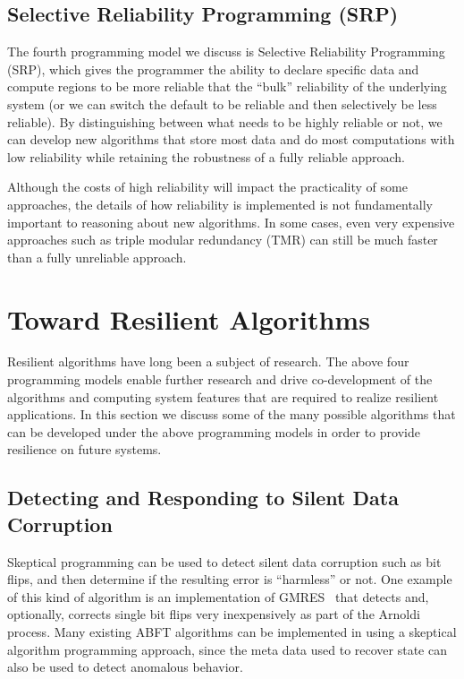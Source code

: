 \documentclass[10pt, twocolumn]{IEEEtran}
\begin{document}
\subsection{Selective Reliability Programming (SRP)}
The fourth programming model we discuss is Selective Reliability Programming (SRP), which gives the programmer the ability to declare specific data and compute regions to be more reliable that the ``bulk'' reliability of the underlying system (or we can switch the default to be reliable and then selectively be less reliable).  By distinguishing between what needs to be highly reliable or not, we can develop new algorithms that store most data and do most computations with low reliability while retaining the robustness of a fully reliable approach.

Although the costs of high reliability will impact the practicality of some approaches, the details of how reliability is  implemented is not fundamentally important to reasoning about new algorithms.  In some cases, even very expensive approaches such as triple modular redundancy (TMR) can still be much faster than a fully unreliable approach.

\section{Toward Resilient Algorithms}

Resilient algorithms have long been a subject of research.  The above four programming models enable further research and drive co-development of the algorithms and  computing system features that are required to realize resilient applications.  In this section we discuss some of the many possible algorithms that can be developed under the above programming models in order to provide resilience on future systems.

\subsection{Detecting and Responding to Silent Data Corruption}
Skeptical programming can be used to detect silent data corruption such as bit flips, and then determine if the resulting error is ``harmless'' or not.  One example of this kind of algorithm is an implementation of GMRES~\cite{Elliott2013} that detects and, optionally, corrects single bit flips very inexpensively as part of the Arnoldi process.  Many existing ABFT algorithms can be implemented in using a skeptical algorithm programming approach, since the meta data used to recover state can also be used to detect anomalous behavior.
\end{document}
